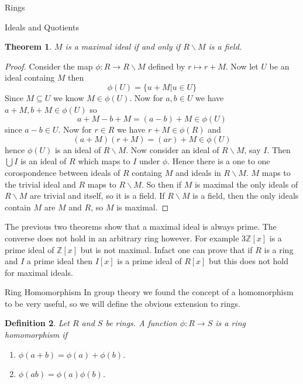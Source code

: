 \documentclass[11pt]{report}
\newcommand{\Z}{\mathbb{Z}}
\newcommand{\B }{\backslash}
\theoremstyle{break}
\newtheorem{thm}{Theorem}[section]
\newtheorem{defn}[thm]{Definition}
\begin{document}
\begin{chapter}{Rings}
\begin{section}{Ideals and Quotients}
    
    \begin{thm}
        $M$ is a maximal ideal if and only if $R\B M$ is a field. 
    \end{thm}

    
    \begin{proof}
        Consider the map $\phi: R \to R\B M$ defined by 
        $r \mapsto r+ M$. Now let $U$ be an ideal containg $M$ then 
        \[\phi(U) = \{u + M| u \in U\} \] 
         Since $M \subseteq U$ we know $M \in \phi(U)$. Now for $a, b \in U$ we have $a + M, b + M \in \phi(U)$ so 
         \[a + M - b + M = (a -b ) + M \in \phi(U)\]
         since $a-b \in U$. Now for $r \in R$ we have $r + M \in \phi(R)$ and 
         \[(a + M)(r + M) = (ar) + M \in \phi(U)\]
         hence $\phi(U)$ is an ideal of $R \B M$. 
         Now consider an ideal of $R \B M$, say $I$. Then $\bigcup I$ is an ideal of $R$ which maps to 
         $I$ under $\phi$. Hence there is a one to one corospondence between ideals of $R$ containg $M$ and 
         ideals in $R \B M$. $M$ maps to the trivial ideal and $R$ maps to $R \B M$. So then if $M$ is maximal 
         the only ideals of $R \B M$ are trivial and itself, so it is a field. If $R \B M$ is a field, then 
         the only ideals contain $M$ are $M$ and $R$, so $M$ is maximal. 

    \end{proof}

    The previous two theorems show that a maximal ideal is always prime. The converse does not hold in an arbitrary ring however. 
    For example $3\Z[x]$ is a prime ideal of $\Z[x]$ but is not maximal. Infact one can prove that if $R$ is a ring and $I$ a prime ideal 
    then $I[x]$ is a prime ideal of $R[x]$ but this does not hold for maximal ideals. 

    
\end{section}


\begin{section}{Ring Homomorphism}
    In group theory we found the concept of a homomorphism to be very useful, so we will define the obvious extension to rings. 

    
    \begin{defn}
        Let $R$ and $S$ be rings. A function $\phi: R \to S$ is a ring homomorphism if 
        
        \begin{enumerate}
            \item $\phi(a + b) = \phi(a) + \phi(b)$. 
            \item $\phi(ab) = \phi(a)\phi(b)$. 
        \end{enumerate}
    \end{defn}


\end{section}
\end{chapter}
\end{document}
